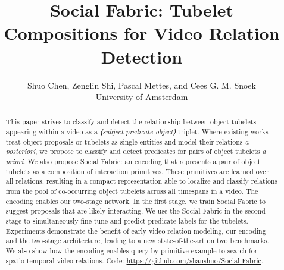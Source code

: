 \documentclass[10pt,twocolumn,letterpaper]{article}
\begin{document}
\title{
Social Fabric: Tubelet Compositions for Video Relation Detection}



\author{Shuo Chen, Zenglin Shi, Pascal Mettes, and Cees G. M. Snoek \\
University of Amsterdam
}

\ificcvfinal\thispagestyle{empty}\fi


\begin{abstract}
This paper strives to classify and detect the relationship between object tubelets appearing within a video as a \emph{⟨subject-predicate-object⟩} triplet. Where existing works treat object proposals or tubelets as single entities and model their relations \emph{a posteriori}, we propose to classify and detect predicates for pairs of object tubelets \emph{a priori}. We also propose Social Fabric: an encoding that represents a pair of object tubelets as a composition of interaction primitives. These primitives are learned over all relations, resulting in a compact representation able to localize and classify relations from the pool of co-occurring object tubelets across all timespans in a video. The encoding enables our two-stage network. In the first stage, we train Social Fabric to suggest proposals that are likely interacting. We use the Social Fabric in the second stage to simultaneously fine-tune and predict predicate labels for the tubelets.
Experiments demonstrate the benefit of early video relation modeling, our encoding and the two-stage architecture, leading to a new state-of-the-art on two  benchmarks. We also show how the encoding enables query-by-primitive-example to search for spatio-temporal video relations. Code:  \url{https://github.com/shanshuo/Social-Fabric}.
\end{abstract}
\end{document}
